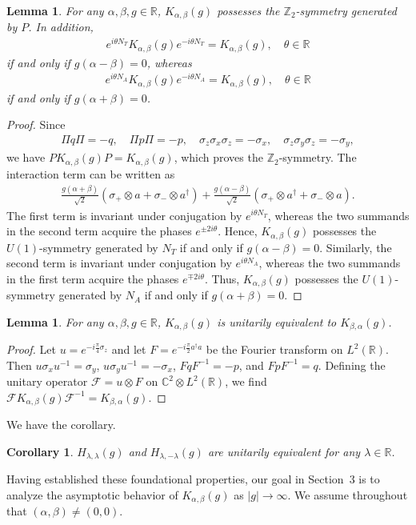 \documentclass[12pt,dvipdfmx]{article}
\newtheorem{lemma}[theorem]{Lemma}
\newtheorem{corollary}[theorem]{Corollary}
\newcommand{\RR}{\mathbb{R}}
\newcommand{\ZZ}{\mathbb{Z}}
\newcommand{\CC}{\mathbb{C}}
\begin{document}
%
\begin{lemma}\label{lem:symm}
For any  $\alpha,\beta,g\in\RR$, $K_{\alpha,\beta}(g)$ possesses the $\ZZ_2$-symmetry generated by $P$. In addition,
\begin{align*}
    e^{i\theta N_T} K_{\alpha,\beta}(g) e^{-i\theta N_T}
    = 
    K_{\alpha,\beta}(g),
    \quad 
\theta\in\RR
\end{align*}
if and only if $g(\alpha-\beta)=0$, whereas
\begin{align*}
    e^{i\theta N_A} K_{\alpha,\beta}(g) e^{-i\theta N_A}
    = 
    K_{\alpha,\beta}(g),
    \quad 
\theta\in\RR
\end{align*}
if and only if $g(\alpha+\beta)=0$.
\end{lemma}
%
\begin{proof}
Since
\begin{align*}
\Pi q\Pi = -q,
\quad    
\Pi p\Pi = -p,
\quad    
\sigma_z\sigma_x\sigma_z = -\sigma_x,
\quad
\sigma_z\sigma_y\sigma_z = -\sigma_y,
\end{align*}
we have
$PK_{\alpha,\beta}(g)P=K_{\alpha,\beta}(g)$,
which proves the $\ZZ_2$-symmetry.
The interaction term can be written as
\begin{align*}
    \frac{g(\alpha+\beta)}{\sqrt{2}}
    \left(\sigma_+\otimes a+\sigma_-\otimes a^\dagger\right)
    +\frac{g(\alpha-\beta)}{\sqrt{2}}
    \left(\sigma_+\otimes a^\dagger+\sigma_-\otimes a\right).
\end{align*}
The first term is invariant under conjugation by $e^{i\theta N_T}$,
whereas the two summands in the second term acquire the phases
$e^{\pm 2i\theta}$. Hence, $K_{\alpha,\beta}(g)$ possesses the
$U(1)$-symmetry generated by $N_T$ if and only if
$g(\alpha-\beta)=0$.
Similarly, the second term is invariant under conjugation by
$e^{i\theta N_A}$, whereas the two summands in the first term acquire
the phases $e^{\mp 2i\theta}$. Thus, $K_{\alpha,\beta}(g)$ possesses
the $U(1)$-symmetry generated by $N_A$ if and only if
$g(\alpha+\beta)=0$.\end{proof}
%
\begin{lemma}\label{lem:exchange}
For any $\alpha, \beta, g \in \RR$, $K_{\alpha,\beta}(g)$ is unitarily equivalent to $K_{\beta,\alpha}(g)$.
\end{lemma}
%
\begin{proof}
Let $u = e^{-i\frac{\pi}{4}\sigma_z}$ and let $F = e^{-i\frac{\pi}{2}a^\dagger a}$ be the Fourier transform on $L^2(\RR)$. Then $u \sigma_x u^{-1} = \sigma_y$, $u \sigma_y u^{-1} = -\sigma_x$, $FqF^{-1} = -p$, and $FpF^{-1} = q$. Defining the unitary operator $\mathcal{F} = u \otimes F$ on $\CC^2 \otimes L^2(\RR)$, we find $\mathcal{F} K_{\alpha,\beta}(g) \mathcal{F}^{-1} = K_{\beta,\alpha}(g)$.
\end{proof}
%
We have the corollary. 
\begin{corollary}
$H_{\lambda,\lambda}(g)$ and  
$H_{\lambda,-\lambda}(g)$ are unitarily equivalent for any $\lambda\in\RR$.
\end{corollary}
%
\medskip
%
Having established these foundational properties, our goal in Section~3 is to analyze the asymptotic behavior of $K_{\alpha,\beta}(g)$ as $|g|\to\infty$. We assume throughout that $(\alpha,\beta)\ne(0,0)$. 
%
%
%
\end{document}

